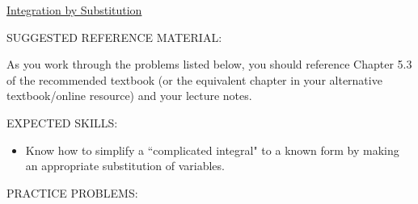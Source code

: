 \documentclass[12pt]{article}
\begin{document}
\begin{center}
\underline{\LARGE{Integration by Substitution}}
\end{center}

\noindent SUGGESTED REFERENCE MATERIAL:

\medskip

\noindent As you work through the problems listed below, you should reference Chapter 5.3 of the recommended textbook (or the equivalent chapter in your alternative textbook/online resource) and your lecture notes.

\medskip

\noindent EXPECTED SKILLS:

\begin{itemize}

\item Know how to simplify a ``complicated integral" to a known form by making an appropriate substitution of variables.

\end{itemize}

\noindent PRACTICE PROBLEMS:

\medskip

\end{document}

